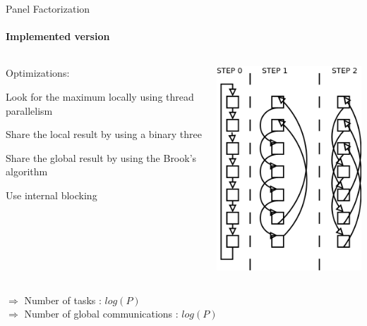 \documentclass{beamer}
\begin{document}
\begin{frame}{Panel Factorization}
\framesubtitle{Implemented version}
\begin{columns}
\begin{column}{.50\textwidth}
Optimizations:
\begin{itemize}
{
\item Look for the maximum locally using thread parallelism
\item Share the local result by using a binary three}
\item Share the global result by using the Brook's algorithm
\item Use internal blocking
\end{itemize}
\end{column}
\hfill
\begin{column}{.50\textwidth}
\begin{center}
\includegraphics[scale=0.5]{bruck.png}
\end{center}
\end{column}
\end{columns}
\pause
\begin{exampleblock}{}
$\Longrightarrow$ Number of tasks : $log(P)$\\
$\Longrightarrow$ Number of global communications : $log(P)$
\end{exampleblock}{}
\end{frame}
\end{document}
